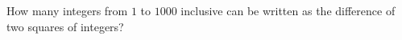 How many integers from $1$ to $1000$ inclusive can be written as the difference of two squares of integers?
